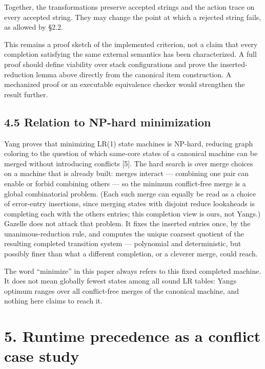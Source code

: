 \documentclass[
  10pt,
]{article}
\begin{document}
Together, the transformations preserve accepted strings and the action
trace on every accepted string. They may change the point at which a
rejected string fails, as allowed by §2.2.

This remains a proof sketch of the implemented criterion, not a claim
that every completion satisfying the same external semantics has been
characterized. A full proof should define viability over stack
configurations and prove the inserted-reduction lemma above directly
from the canonical item construction. A mechanized proof or an
executable equivalence checker would strengthen the result further.

\hypertarget{45-relation-to-np-hard-minimization}{%
\subsection{4.5 Relation to NP-hard
minimization}\label{45-relation-to-np-hard-minimization}}

Yang proves that minimizing LR(1) state machines is NP-hard, reducing
graph coloring to the question of which same-core states of a canonical
machine can be merged without introducing conflicts {[}5{]}. The hard
search is over merge choices on a machine that is already built: merges
interact --- combining one pair can enable or forbid combining others
--- so the minimum conflict-free merge is a global combinatorial
problem. (Each such merge can equally be read as a choice of error-entry
insertions, since merging states with disjoint reduce lookaheads is
completing each with the other\textquotesingle s entries; this
completion view is ours, not Yang\textquotesingle s.) Gazelle does not
attack that problem. It fixes the inserted entries once, by the
unanimous-reduction rule, and computes the unique coarsest quotient of
the resulting completed transition system --- polynomial and
deterministic, but possibly finer than what a different completion, or a
cleverer merge, could reach.

The word ``minimize'' in this paper always refers to this fixed
completed machine. It does not mean globally fewest states among all
sound LR tables: Yang\textquotesingle s optimum ranges over all
conflict-free merges of the canonical machine, and nothing here claims
to reach it.

\hypertarget{5-runtime-precedence-as-a-conflict-case-study}{%
\section{5. Runtime precedence as a conflict case
study}\label{5-runtime-precedence-as-a-conflict-case-study}}
\end{document}
